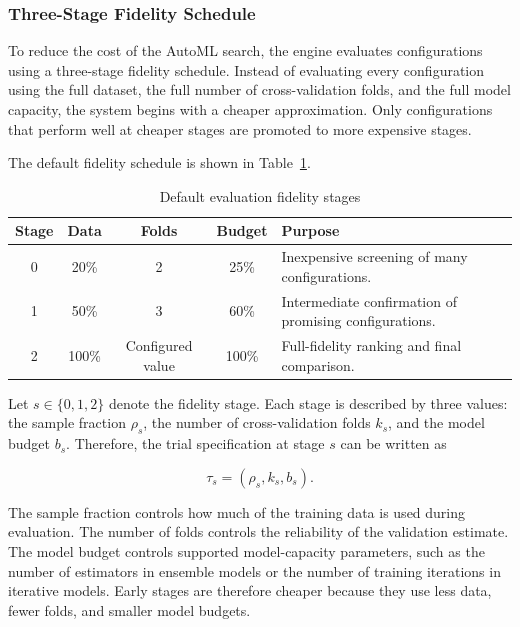 \documentclass[12pt,a4paper]{report}
\begin{document}
\subsubsection{Three-Stage Fidelity Schedule}

To reduce the cost of the AutoML search, the engine evaluates configurations
using a three-stage fidelity schedule. Instead of evaluating every configuration
using the full dataset, the full number of cross-validation folds, and the full
model capacity, the system begins with a cheaper approximation. Only
configurations that perform well at cheaper stages are promoted to more
expensive stages.

\noindent The default fidelity schedule is shown in Table~\ref{tab:gp-automl-fidelity-schedule}.

\begin{table}[H]
\centering
\caption{Default evaluation fidelity stages}
\label{tab:gp-automl-fidelity-schedule}
\renewcommand{\arraystretch}{1.25}
\begin{tabular}{c c c c p{}}
\toprule
\textbf{Stage} &
\textbf{Data} &
\textbf{Folds} &
\textbf{Budget} &
\textbf{Purpose} \\
\midrule
0 & 20\% & 2 & 25\% &
Inexpensive screening of many configurations. \\

1 & 50\% & 3 & 60\% &
Intermediate confirmation of promising configurations. \\

2 & 100\% & Configured value & 100\% &
Full-fidelity ranking and final comparison. \\
\bottomrule
\end{tabular}
\end{table}

\noindent Let \(s \in \{0,1,2\}\) denote the fidelity stage. Each stage is described by
three values: the sample fraction \(\rho_s\), the number of cross-validation
folds \(k_s\), and the model budget \(b_s\). Therefore, the trial specification
at stage \(s\) can be written as

\[
\tau_s = (\rho_s, k_s, b_s).
\]

\noindent The sample fraction controls how much of the training data is used during
evaluation. The number of folds controls the reliability of the validation
estimate. The model budget controls supported model-capacity parameters, such as
the number of estimators in ensemble models or the number of training iterations
in iterative models. Early stages are therefore cheaper because they use less
data, fewer folds, and smaller model budgets.
\end{document}
